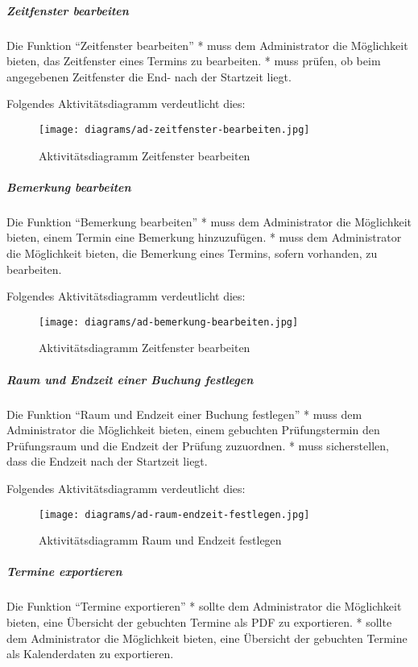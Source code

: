 \documentclass[]{article}
\let\oldsubparagraph\subparagraph
\renewcommand{\subparagraph}[1]{\oldsubparagraph{#1}\mbox{}}
\begin{document}
\hypertarget{zeitfenster-bearbeiten}{%
\subparagraph{Zeitfenster bearbeiten}\label{zeitfenster-bearbeiten}}

Die Funktion ``Zeitfenster bearbeiten'' * muss dem Administrator die
Möglichkeit bieten, das Zeitfenster eines Termins zu bearbeiten. * muss
prüfen, ob beim angegebenen Zeitfenster die End- nach der Startzeit
liegt.

Folgendes Aktivitätsdiagramm verdeutlicht dies:

\begin{figure}
\centering
\texttt{[image: diagrams/ad-zeitfenster-bearbeiten.jpg]}
\caption{Aktivitätsdiagramm Zeitfenster bearbeiten}
\end{figure}

\hypertarget{bemerkung-bearbeiten}{%
\subparagraph{Bemerkung bearbeiten}\label{bemerkung-bearbeiten}}

Die Funktion ``Bemerkung bearbeiten'' * muss dem Administrator die
Möglichkeit bieten, einem Termin eine Bemerkung hinzuzufügen. * muss dem
Administrator die Möglichkeit bieten, die Bemerkung eines Termins,
sofern vorhanden, zu bearbeiten.

Folgendes Aktivitätsdiagramm verdeutlicht dies:

\begin{figure}
\centering
\texttt{[image: diagrams/ad-bemerkung-bearbeiten.jpg]}
\caption{Aktivitätsdiagramm Zeitfenster bearbeiten}
\end{figure}

\hypertarget{raum-und-endzeit-einer-buchung-festlegen}{%
\subparagraph{Raum und Endzeit einer Buchung
festlegen}\label{raum-und-endzeit-einer-buchung-festlegen}}

Die Funktion ``Raum und Endzeit einer Buchung festlegen'' * muss dem
Administrator die Möglichkeit bieten, einem gebuchten Prüfungstermin den
Prüfungsraum und die Endzeit der Prüfung zuzuordnen. * muss
sicherstellen, dass die Endzeit nach der Startzeit liegt.

Folgendes Aktivitätsdiagramm verdeutlicht dies:

\begin{figure}
\centering
\texttt{[image: diagrams/ad-raum-endzeit-festlegen.jpg]}
\caption{Aktivitätsdiagramm Raum und Endzeit festlegen}
\end{figure}

\hypertarget{termine-exportieren}{%
\subparagraph{Termine exportieren}\label{termine-exportieren}}

Die Funktion ``Termine exportieren'' * sollte dem Administrator die
Möglichkeit bieten, eine Übersicht der gebuchten Termine als PDF zu
exportieren. * sollte dem Administrator die Möglichkeit bieten, eine
Übersicht der gebuchten Termine als Kalenderdaten zu exportieren.
\end{document}
